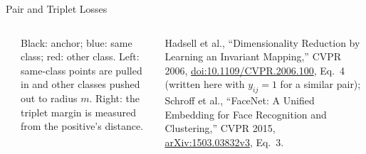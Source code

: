 \begin{frame}{Pair and Triplet Losses}
\begin{columns}[T,onlytextwidth]
{}\\[0.3em]
      {\scriptsize Black: anchor; blue: same class; red: other class. Left: same-class points are pulled in and other classes pushed out to radius $m$. Right: the triplet margin is measured from the positive's distance.\par}
      \vspace{0.5em}
      {\scriptsize Hadsell et al., ``Dimensionality Reduction by Learning an Invariant Mapping,'' CVPR 2006, \href{https://doi.org/10.1109/CVPR.2006.100}{doi:10.1109/CVPR.2006.100}, Eq.~4 (written here with $y_{ij}=1$ for a similar pair); Schroff et al., ``FaceNet: A Unified Embedding for Face Recognition and Clustering,'' CVPR 2015, \href{https://arxiv.org/abs/1503.03832v3}{arXiv:1503.03832v3}, Eq.~3.\par}
  \end{columns}
\end{frame}

